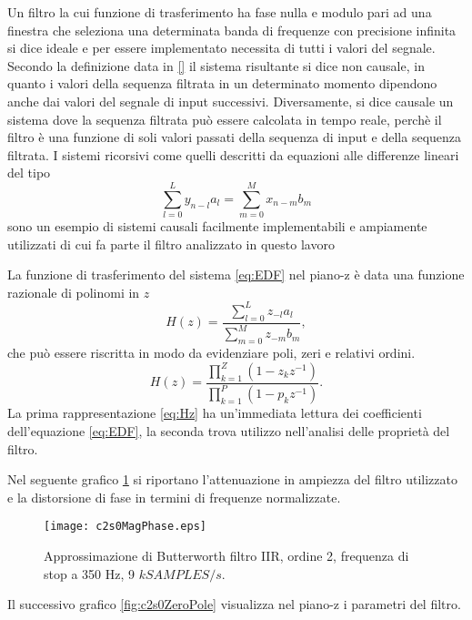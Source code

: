 Un filtro la cui funzione di trasferimento ha fase nulla e modulo pari ad una finestra che seleziona una determinata banda di frequenze con precisione infinita si dice ideale e per essere implementato necessita di tutti i valori del segnale. Secondo la definizione data in \ref{}
il sistema risultante si dice non causale, in quanto i valori della sequenza filtrata in un determinato momento dipendono anche dai valori del segnale di input successivi. Diversamente, si dice causale un sistema dove la sequenza filtrata può essere calcolata in tempo reale, perchè il filtro è una funzione di soli valori passati della sequenza di input e della sequenza filtrata.
I sistemi ricorsivi come quelli descritti da equazioni alle differenze lineari del tipo
\begin{equation}
\sum_{l=0}^{L} y_{n-l}a_{l} = \sum_{m=0}^{M} x_{n-m}b_{m}
\label{eq:EDF}
\end{equation}
sono un esempio di sistemi causali facilmente implementabili e ampiamente utilizzati di cui fa parte il filtro analizzato in questo lavoro

La  funzione di trasferimento del sistema \ref{eq:EDF} nel piano-z è data una funzione razionale di polinomi in $z$
\begin{equation}
 H(z) = \frac{ \sum_{l=0}^{L} z_{-l}a_{l} }
             { \sum_{m=0}^{M} z_{-m}b_{m} },
\label{eq:Hz}
\end{equation}
che può essere riscritta in modo da evidenziare poli, zeri e relativi ordini.
\begin{equation}
 H(z) = \frac{ \prod_{k=1}^{Z} (1-z_{k}z^{-1}) }
             { \prod_{k=1}^{P} (1-p_{k}z^{-1}) }.
\label{eq:Hzp}
\end{equation}
La prima rappresentazione \ref{eq:Hz} ha un'immediata lettura dei coefficienti dell'equazione \ref{eq:EDF}, la seconda trova utilizzo nell'analisi delle proprietà del filtro.

Nel seguente grafico \ref{fig:c2s0MagPhase} si riportano l'attenuazione in ampiezza del filtro utilizzato e la distorsione di fase in termini di frequenze normalizzate.

\begin{figure}%
\centering    
\texttt{[image: c2s0MagPhase.eps]}
\caption[Funzione di trasferimento del filtro]
{ Approssimazione di Butterworth filtro IIR, ordine 2, frequenza di stop a 350 Hz, 9 $kSAMPLES/s$. }
\label{fig:c2s0MagPhase}
\end{figure}


Il successivo grafico \ref{fig:c2s0ZeroPole} visualizza nel piano-z i parametri del filtro. 


